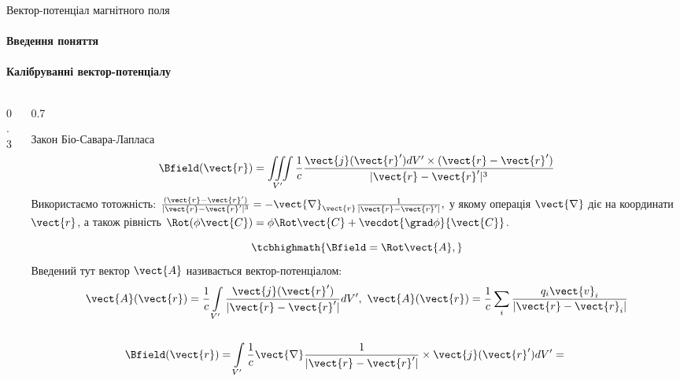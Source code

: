 \documentclass{beamer}
\begin{document}
\begin{frame}[t]{Вектор-потенціал магнітного поля}{}
	\framesubtitle<1>{Введення поняття} \framesubtitle<2>{Калібруванні вектор-потенціалу}
	\begin{columns}
		\begin{column}{0.3\linewidth}\centering
			
		\end{column}
		\begin{column}{0.7\linewidth}
			\begin{overprint}
				\begin{block}{}
					Закон Біо-Савара-Лапласа
					\begin{equation*}
						\Bfield(\vect{r}) = \iiint\limits_{V'} \frac1c \frac{
							\vect{j}(\vect{r}')dV'\times(\vect{r} - \vect{r}') }{|\vect{r} -
							\vect{r}'|^3}
					\end{equation*}
					{\small Використаємо тотожність: \( \frac{ (\vect{r} - \vect{r}')
						}{|\vect{r} - \vect{r}'|^3} = - \vect{\nabla}_{\vect{r}} \frac{ 1
						}{|\vect{r} - \vect{r}'|}, \) у якому операція $\vect{\nabla}$ діє на
						координати $\vect{r}$, а також рівність $\Rot(\phi\vect{C}) =
							\phi\Rot\vect{C} + \vecdot{\grad\phi}{\vect{C}} $.}
				\end{block}
				\onslide<2>
				\begin{block}{}
					\begin{equation*}
						\tcbhighmath{\Bfield = \Rot\vect{A},}
					\end{equation*}
					Введений тут вектор $\vect{A}$ називається \alert{вектор-потенціалом}:
					\begin{equation*}
						\vect{A}(\vect{r}) = \frac1c \int\limits_{V'}
						\frac{\vect{j}(\vect{r}')}{|\vect{r} - \vect{r}'|} dV', \
						\vect{A}(\vect{r}) = \frac1c \sum\limits_i
						\frac{q_i\vect{v}_i}{|\vect{r} - \vect{r}_i|}
					\end{equation*}
				\end{block}
			\end{overprint}
		\end{column}
	\end{columns}
	\begin{overprint}
		\begin{block}{}
			\begin{equation*}
				\Bfield(\vect{r}) =\int\limits_{V'} \frac1c \vect{\nabla} \frac{ 1
				}{|\vect{r} - \vect{r}'|}\times\vect{j} (\vect{r}') dV' =

\end{equation*}
\end{block}
\end{overprint}
\end{frame}
\end{document}
